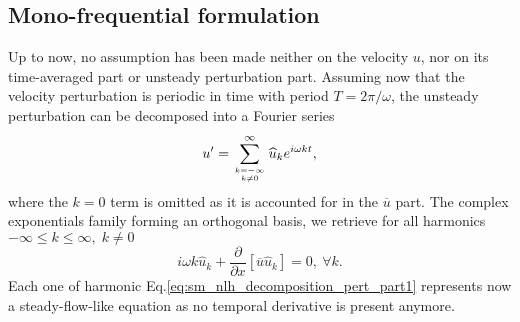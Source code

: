 \subsection{Mono-frequential formulation}
Up to now, no assumption has been made neither on the velocity $u$,
nor on its time-averaged part or unsteady perturbation part.
Assuming now that the velocity perturbation 
is periodic in time with period
$T=2 \pi / \omega$,
the unsteady perturbation can be decomposed into 
a Fourier series
\begin{equation}
	u^\prime = \sum_{\genfrac{}{}{0pt}{}{k=-\infty}{k \neq 0}}^{\infty} 
	\widehat{u}_k e^{i \omega k t},
	\label{eq:sm_nlh_decomposition_pert}
\end{equation}
where the $k=0$ term is omitted as it is accounted for in
the $\overline{u}$ part.
The complex exponentials family forming
an orthogonal basis, we retrieve for all harmonics 
$-\infty \leq k \leq \infty, \; k \neq 0$
\begin{equation}
	i \omega k \widehat{u}_k + 
	\frac{\partial}{\partial x} \left[ \overline{u} \widehat{u}_k\right] =
	0,~\forall k.
	\label{eq:sm_nlh_decomposition_pert_part1}
\end{equation}
Each one of harmonic Eq.\eqref{eq:sm_nlh_decomposition_pert_part1}
represents now a steady-flow-like equation as no temporal
derivative is present anymore.

